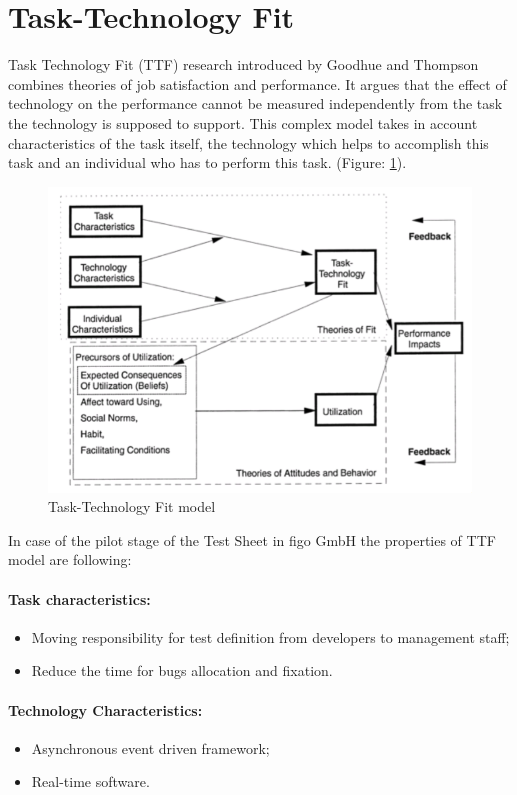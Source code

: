 \section{Task-Technology Fit}
Task Technology Fit (TTF) research introduced by Goodhue and Thompson \cite{MES10} combines theories of job satisfaction and performance. It argues that the effect of technology on the performance cannot be measured independently from the task the technology is supposed to support. This complex model takes in account characteristics of the task itself, the technology which helps to accomplish this task and an individual who has to perform this task. (Figure: \ref{fig:ttf}).
\begin{figure}[ht]
	\label{fig:ttf}
	\centering
	\includegraphics[width=\textwidth]{grafiken/ttf.png}
	\caption{Task-Technology Fit model\cite{MES10}}
\end{figure}

In case of the pilot stage of the Test Sheet in figo GmbH the properties of TTF model are following:
\paragraph{Task characteristics:}
\begin{itemize}
	\item Moving responsibility for test definition from developers to management staff;
	\item Reduce the time for bugs allocation and fixation.
\end{itemize}


\paragraph{Technology Characteristics:}
\begin{itemize}
	\item Asynchronous event driven framework;
	\item Real-time software.
\end{itemize}

